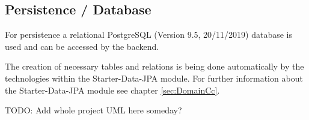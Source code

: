 \subsection{Persistence / Database}
\label{sec:DomainCd}

For persistence a relational PostgreSQL (Version 9.5, 20/11/2019) database is used and can be accessed by the backend. 

The creation of necessary tables and relations is being done automatically by the technologies within the Starter-Data-\ac{JPA} module. For further information about the Starter-Data-\ac{JPA} module see chapter \ref{sec:DomainCc}.

TODO: Add whole project UML here someday?

